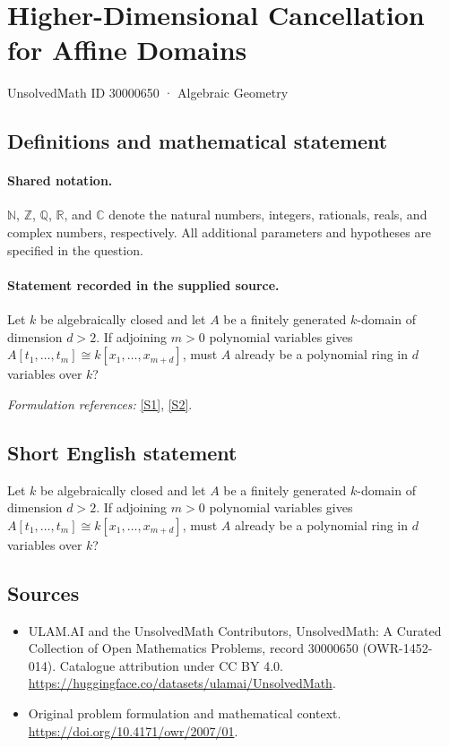 \documentclass[11pt]{article}
\newcommand{\sref}[2]{\hyperlink{source:#1:#2}{[S#2]}}
\begin{document}
\setcounter{section}{30000649}
\section{Higher-Dimensional Cancellation for Affine Domains}\label{30000650}
{\small UnsolvedMath ID 30000650 · Algebraic Geometry}
\subsection{Definitions and mathematical statement}

\paragraph{Shared notation.}$\mathbb N$, $\mathbb Z$, $\mathbb Q$, $\mathbb R$, and $\mathbb C$ denote the natural numbers, integers, rationals, reals, and complex numbers, respectively. All additional parameters and hypotheses are specified in the question.


\paragraph{Statement recorded in the supplied source.}
Let $k$ be algebraically closed and let $A$ be a finitely generated $k$-domain of dimension $d>2$. If adjoining $m>0$ polynomial variables gives $A[t_1,\ldots,t_m]\cong k[x_1,\ldots,x_{m+d}]$, must $A$ already be a polynomial ring in $d$ variables over $k$?
\par\smallskip\textit{Formulation references:} \sref{30000650}{1}, \sref{30000650}{2}.
\subsection{Short English statement}
Let $k$ be algebraically closed and let $A$ be a finitely generated $k$-domain of dimension $d>2$. If adjoining $m>0$ polynomial variables gives $A[t_1,\ldots,t_m]\cong k[x_1,\ldots,x_{m+d}]$, must $A$ already be a polynomial ring in $d$ variables over $k$?
\subsection{Sources}
\begin{itemize}
\item[\hypertarget{source:30000650:1}{S1}] ULAM.AI and the UnsolvedMath Contributors, UnsolvedMath: A Curated Collection of Open Mathematics Problems, record 30000650 (OWR-1452-014). Catalogue attribution under CC BY 4.0.
\url{https://huggingface.co/datasets/ulamai/UnsolvedMath}.
\item[\hypertarget{source:30000650:2}{S2}] Original problem formulation and mathematical context.
\url{https://doi.org/10.4171/owr/2007/01}.
\end{itemize}
\label{end:30000650}
\end{document}
